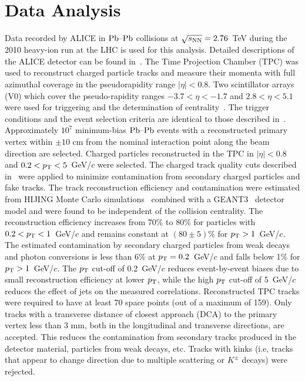 \section{Data Analysis}
\label{sec:experiment}
Data recorded by ALICE in $\textnormal{Pb--Pb}$ collisions at $\sqrt{s_{\textnormal{NN}}}=2.76$~TeV during the 2010 heavy-ion run at the
LHC is used for this analysis. Detailed descriptions of the ALICE
detector can be found
in~\cite{Aamodt:2008zz,Carminati:2004fp,Alessandro:2006yt}. The Time
Projection Chamber (TPC) was used to reconstruct charged particle
tracks and measure their momenta with full azimuthal coverage in the
pseudorapidity range $|\eta|<0.8$. Two scintillator
arrays (V0) which cover the pseudo-rapidity ranges $-3.7<\eta<-1.7$
and $2.8<\eta<5.1$ were used for triggering and the determination of
centrality~\cite{Aamodt:2010cz}. The trigger
conditions and the event selection criteria are identical to those
described in~\cite{Aamodt:2010pa, Aamodt:2010cz}.
Approximately $10^7$ minimum-bias $\textnormal{Pb--Pb}$ events with
a reconstructed primary vertex within $\pm 10$ cm from the nominal
interaction point along the beam direction are selected. Charged particles reconstructed in the TPC in $|\eta|<0.8$
and $0.2<p_{\rm T}<5$~GeV/$c$ were selected. The charged track quality cuts
described in~\cite{Aamodt:2010pa} were applied to minimize
contamination from secondary charged particles and fake tracks.
The track reconstruction efficiency and contamination
were estimated from HIJING Monte Carlo
simulations~\cite{Wang:1991hta} combined with a GEANT3~\cite{Brun:1994aa} detector model and were found to be independent of
the collision centrality. The reconstruction efficiency increases from
70\% to 80\% for particles with $0.2<p_{\rm T}<1$~GeV/$c$ and remains
constant at $(80 \pm 5)$\% for $p_{\rm T}>1$~GeV/$c$. The estimated
contamination by secondary charged particles from weak decays and
photon conversions is less than 6\% at $p_{\rm T}=0.2$~GeV/$c$ and falls
below 1\% for $p_{\rm T}>1$~GeV/$c$.
The $p_{\rm T}$ cut-off of 0.2~GeV/$c$ reduces event-by-event biases due to small reconstruction efficiency 
at lower $p_{\rm T}$, while the high $p_{\rm T}$ cut-off of 5~GeV/$c$ reduces the effect of jets on the measured correlations. 
Reconstructed TPC tracks were required to have at least 70 space points (out of a maximum of 159). 
Only tracks with a transverse distance of closest approach (DCA) to the primary vertex less than 3 mm, both in the longitudinal and transverse directions, are accepted. This reduces the contamination from secondary tracks produced in the detector material, particles from weak decays, etc. Tracks with kinks (i.e, tracks that appear to change direction due to multiple scattering or $K^{\pm}$ decays) were rejected.


